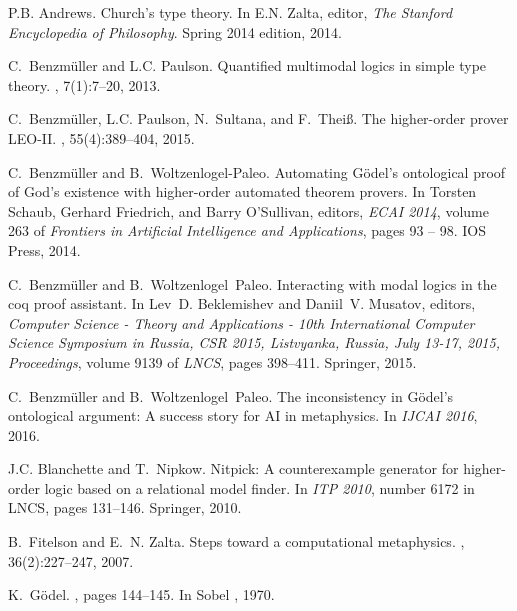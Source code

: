 \documentclass{llncs}
\begin{document}

%
\begin{thebibliography}{10}

P.B. Andrews.
\newblock Church's type theory.
\newblock In E.N. Zalta, editor, {\em The Stanford Encyclopedia of Philosophy}.
  Spring 2014 edition, 2014.

C.~Benzm{\"u}ller and L.C. Paulson.
\newblock Quantified multimodal logics in simple type theory.
, 7(1):7--20, 2013.

C.~Benzm{\"u}ller, L.C. Paulson, N.~Sultana, and F.~Thei{\ss}.
\newblock The higher-order prover {LEO-II}.
, 55(4):389--404, 2015.

C.~Benzm{\"u}ller and B.~Woltzenlogel-Paleo.
\newblock Automating {G\"{o}del's} ontological proof of {God}'s existence with
  higher-order automated theorem provers.
\newblock In Torsten Schaub, Gerhard Friedrich, and Barry O'Sullivan, editors,
  {\em ECAI 2014}, volume 263 of {\em Frontiers in Artificial Intelligence and
  Applications}, pages 93 -- 98. IOS Press, 2014.

C.~Benzm{\"{u}}ller and B.~Woltzenlogel~Paleo.
\newblock Interacting with modal logics in the coq proof assistant.
\newblock In Lev~D. Beklemishev and Daniil~V. Musatov, editors, {\em Computer
  Science - Theory and Applications - 10th International Computer Science
  Symposium in Russia, {CSR} 2015, Listvyanka, Russia, July 13-17, 2015,
  Proceedings}, volume 9139 of {\em LNCS}, pages 398--411. Springer, 2015.

C.~Benzm{\"u}ller and B.~Woltzenlogel~Paleo.
\newblock The inconsistency in {G{\"o}del's} ontological argument: A success
  story for {AI} in metaphysics.
\newblock In {\em IJCAI 2016}, 2016.

J.C. Blanchette and T.~Nipkow.
\newblock Nitpick: A counterexample generator for higher-order logic based on a
  relational model finder.
\newblock In {\em ITP 2010}, number 6172 in LNCS, pages 131--146. Springer,
  2010.

B.~Fitelson and E.~N. Zalta.
\newblock Steps toward a computational metaphysics.
, 36(2):227--247, 2007.

K.~G\"odel.
, pages 144--145.
\newblock In Sobel \cite{sobel2004logic}, 1970.


\end{thebibliography}
\end{document}
